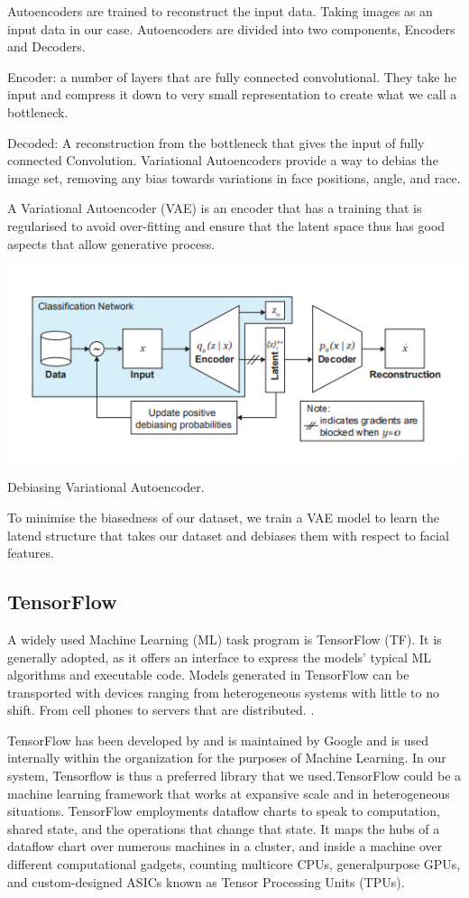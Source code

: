  Autoencoders are trained to reconstruct the input data. Taking images as an input data in our case.
 Autoencoders are divided into two components, Encoders and Decoders.
 \item Encoder: a number of layers that are fully connected convolutional. They take he input and compress it down to very small representation
 to create what we call a bottleneck. 
 \item Decoded: A reconstruction from the bottleneck that gives the input of fully connected Convolution.
Variational Autoencoders provide a way to debias the image set, removing any bias towards variations in face positions, angle, and race.


A Variational Autoencoder (VAE) is an encoder that has a training that is regularised to avoid over-fitting and ensure that the 
latent space thus has good aspects that allow generative process.  

\includegraphics[width=.6\textwidth,height=.7\textheight,keepaspectratio]{tex/images/vae.png}
\caption{Debiasing Variational Autoencoder.}

To minimise the biasedness of our dataset, we train a VAE model to learn the latend structure that takes our dataset and debiases them with respect to facial features.


\subsection{TensorFlow}
A widely used Machine Learning (ML) task program is TensorFlow (TF). It is generally adopted, as it offers an interface to express the models' typical ML algorithms and executable code. Models generated in TensorFlow  can be transported with devices ranging from heterogeneous systems with little to no shift.
From cell phones to servers that are distributed. 
\vspace{5mm}.

TensorFlow  has been developed by and is maintained by Google and is used internally within the organization for the purposes of Machine Learning.
In our system, Tensorflow is thus a preferred library that we used.TensorFlow could be a machine learning framework that works at expansive scale and in heterogeneous situations. TensorFlow employments dataflow charts to speak to computation, shared state, and the operations that change that state. It maps the hubs of a dataflow chart over numerous machines in a cluster, and inside a machine over different computational gadgets, counting multicore CPUs, generalpurpose GPUs, and custom-designed ASICs known as Tensor Processing Units (TPUs).

